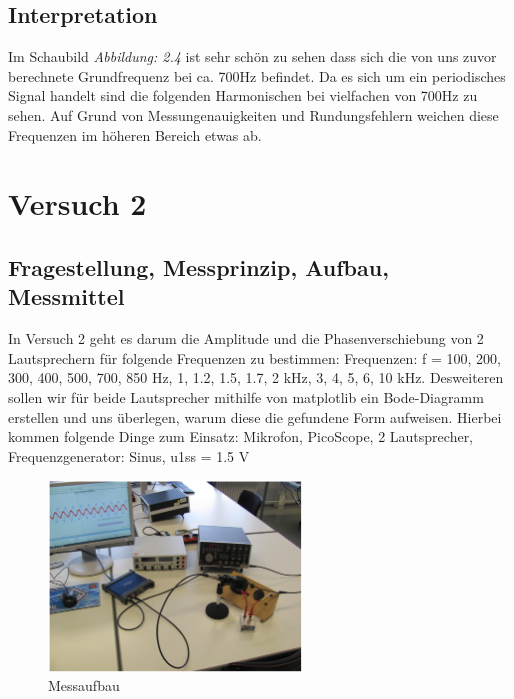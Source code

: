 \documentclass[12pt, oneside, a4paper, \docLanguage]{report}
\begin{document}
\section{Interpretation}
\label{chap:VERSUCH_1_INTERPRETATION}
\begin{normalsize}
Im Schaubild \textit{Abbildung: 2.4} ist sehr schön zu sehen dass sich die von uns zuvor berechnete Grundfrequenz
bei ca. 700Hz befindet. Da es sich um ein periodisches Signal handelt sind die folgenden Harmonischen bei vielfachen von 700Hz zu sehen.
Auf Grund von Messungenauigkeiten und Rundungsfehlern weichen diese Frequenzen im höheren Bereich etwas ab. 
\end{normalsize}

%
%
\chapter{Versuch 2}
\label{chap:VERSUCH_2}

\section{Fragestellung, Messprinzip, Aufbau, Messmittel}
\label{chap:VERSUCH_2_FRAGESTELLUNG}
\begin{normalsize}
In Versuch 2 geht es darum die Amplitude und die Phasenverschiebung von 2 Lautsprechern für folgende Frequenzen zu bestimmen:\newline
Frequenzen: f = 100, 200, 300, 400, 500, 700, 850 Hz, 1, 1.2, 1.5, 1.7, 2 kHz, 3, 4, 5, 6, 10 kHz.\newline
Desweiteren sollen wir für beide Lautsprecher mithilfe von matplotlib ein Bode-Diagramm erstellen und uns überlegen, warum diese die gefundene Form aufweisen.\newline
Hierbei kommen folgende Dinge zum Einsatz:\newline
Mikrofon, PicoScope, 2 Lautsprecher, Frequenzgenerator: Sinus, u1ss = 1.5 V\newline
\begin{figure}[H]
\centering
\includegraphics[width=0.6\textwidth]{../MeasuringBuilding.png}
\caption{Messaufbau}
\end{figure}
\end{normalsize}
\end{document}
